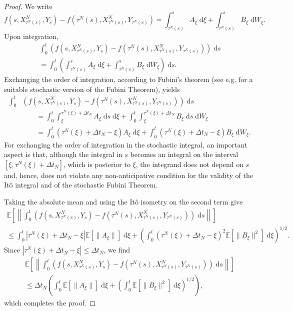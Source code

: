 \documentclass[reqno,12pt]{amsart}
\theoremstyle{plain} %
\theoremstyle{definition} %
\begin{document}
\begin{proof}
    We write
    \[
        f(s, X_{\tau^N(s)}^N, Y_s) - f(\tau^N(s), X_{\tau^N(s)}^N, Y_{\tau^N(s)}) = \int_{\tau^N(s)}^s A_\xi \;\mathrm{d}\xi + \int_{\tau^N(s)}^s B_\xi \;\mathrm{d}W_\xi.
    \]
    Upon integration,
    \begin{multline*}
        \int_0^t \left(f(s, X_{\tau^N(s)}^N, Y_s) - f(\tau^N(s), X_{\tau^N(s)}^N, Y_{\tau^N(s)})\right)\;\mathrm{d}s  \\
        = \int_0^t \left(\int_{\tau^N(s)}^s A_\xi \;\mathrm{d}\xi + \int_{\tau^N(s)}^s B_\xi \;\mathrm{d}W_\xi\right)\;\mathrm{d}s.
    \end{multline*}
    Exchanging the order of integration, according to Fubini's theorem (see e.g. \cite[Section IV.6]{Protter2005} for a suitable stochastic version of the Fubini Theorem), yields
    \begin{align*}
        \int_0^t & \left(f(s, X_{\tau^N(s)}^N, Y_s) - f(\tau^N(s), X_{\tau^N(s)}^N, Y_{\tau^N(s)})\right)\;\mathrm{d}s \\
        & \qquad = \int_0^t \int_\xi^{\tau^N(\xi)+\Delta t_N} A_\xi \;\mathrm{d}s\;\mathrm{d}\xi + \int_0^t \int_\xi^{\tau^N(\xi) + \Delta t_N} B_\xi \;\mathrm{d}s\;\mathrm{d}W_\xi \\
        & \qquad = \int_0^t (\tau^N(\xi)+\Delta t_N - \xi) A_\xi \;\mathrm{d}\xi + \int_0^t (\tau^N(\xi) + \Delta t_N - \xi) B_\xi \;\mathrm{d}W_\xi.
    \end{align*}
    For exchanging the order of integration in the stochastic integral, an important aspect is that, although the integral in $s$ becomes an integral on the interval $[\xi, \tau^N(\xi) + \Delta t_N]$, which is posterior to $\xi$, the integrand does not depend on $s$ and, hence, does not violate any non-anticipative condition for the validity of the It\^o integral and of the stochastic Fubini Theorem.

    Taking the absolute mean and using the It\^o isometry \cite{Oksendal2003} on the second term give
    \begin{multline*}
        \mathbb{E}\left[\left\|\int_0^t \left(f(s, X_{\tau^N(s)}^N, Y_s) - f(\tau^N(s), X_{\tau^N(s)}^N, Y_{\tau^N(s)})\right)\;\mathrm{d}s\right\|\right]  \\
        \leq \int_0^t |\tau^N(\xi)+\Delta t_N - \xi| \mathbb{E}[\|A_\xi\|] \;\mathrm{d}\xi + \left(\int_0^t (\tau^N(\xi) + \Delta t_N - \xi)^2 \mathbb{E}[\|B_\xi\|^2] \;\mathrm{d}\xi \right)^{1/2}.
    \end{multline*}
    Since $|\tau^N(\xi)+\Delta t_N - \xi| \leq \Delta t_N$, we find
    \begin{multline*}
        \mathbb{E}\left[\left\|\int_0^t \left(f(s, X_{\tau^N(s)}^N, Y_s) - f(\tau^N(s), X_{\tau^N(s)}^N, Y_{\tau^N(s)})\right)\;\mathrm{d}s\right\|\right]  \\
        \leq \Delta t_N \left(\int_0^t \mathbb{E}[\|A_\xi\|] \;\mathrm{d}\xi + \left(\int_0^t \mathbb{E}[\|B_\xi\|^2] \;\mathrm{d}\xi \right)^{1/2}\right),
    \end{multline*}
    which completes the proof.
\end{proof}
\end{document}
